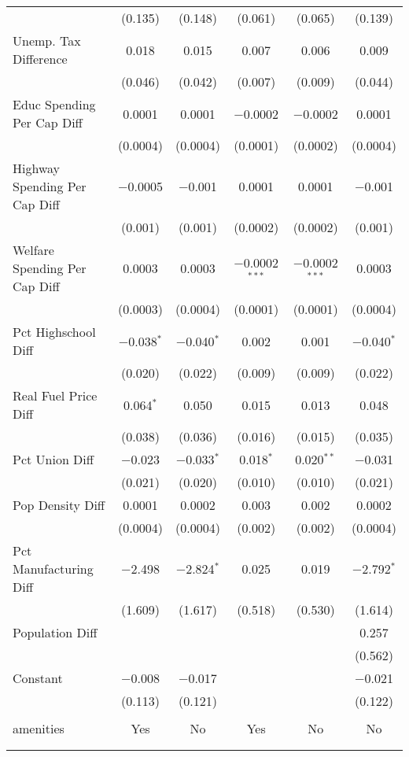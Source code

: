 \begin{table}[!htbp]
\begin{tabular}{@{\extracolsep{5pt}}lccccc}
  & (0.135) & (0.148) & (0.061) & (0.065) & (0.139) \\ 
  Unemp. Tax Difference & 0.018 & 0.015 & 0.007 & 0.006 & 0.009 \\ 
  & (0.046) & (0.042) & (0.007) & (0.009) & (0.044) \\ 
  Educ Spending Per Cap Diff & 0.0001 & 0.0001 & $-$0.0002 & $-$0.0002 & 0.0001 \\ 
  & (0.0004) & (0.0004) & (0.0001) & (0.0002) & (0.0004) \\ 
  Highway Spending Per Cap Diff & $-$0.0005 & $-$0.001 & 0.0001 & 0.0001 & $-$0.001 \\ 
  & (0.001) & (0.001) & (0.0002) & (0.0002) & (0.001) \\ 
  Welfare Spending Per Cap Diff & 0.0003 & 0.0003 & $-$0.0002$^{***}$ & $-$0.0002$^{***}$ & 0.0003 \\ 
  & (0.0003) & (0.0004) & (0.0001) & (0.0001) & (0.0004) \\ 
  Pct Highschool Diff & $-$0.038$^{*}$ & $-$0.040$^{*}$ & 0.002 & 0.001 & $-$0.040$^{*}$ \\ 
  & (0.020) & (0.022) & (0.009) & (0.009) & (0.022) \\ 
  Real Fuel Price Diff & 0.064$^{*}$ & 0.050 & 0.015 & 0.013 & 0.048 \\ 
  & (0.038) & (0.036) & (0.016) & (0.015) & (0.035) \\ 
  Pct Union Diff & $-$0.023 & $-$0.033$^{*}$ & 0.018$^{*}$ & 0.020$^{**}$ & $-$0.031 \\ 
  & (0.021) & (0.020) & (0.010) & (0.010) & (0.021) \\ 
  Pop Density Diff & 0.0001 & 0.0002 & 0.003 & 0.002 & 0.0002 \\ 
  & (0.0004) & (0.0004) & (0.002) & (0.002) & (0.0004) \\ 
  Pct Manufacturing Diff & $-$2.498 & $-$2.824$^{*}$ & 0.025 & 0.019 & $-$2.792$^{*}$ \\ 
  & (1.609) & (1.617) & (0.518) & (0.530) & (1.614) \\ 
  Population Diff &  &  &  &  & 0.257 \\ 
  &  &  &  &  & (0.562) \\ 
  Constant & $-$0.008 & $-$0.017 &  &  & $-$0.021 \\ 
  & (0.113) & (0.121) &  &  & (0.122) \\ 
 \hline \\[-1.8ex] 
amenities & Yes & No & Yes & No & No \\ 
\hline \\[-1.8ex] 
\hline 
\hline \\[-1.8ex] 
\end{tabular} 
\end{table} 
